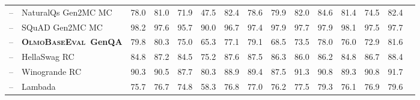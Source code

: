 \documentclass[table]{ai2style/ai2}
\newcommand{\olmothreeeval}{\textsc{OlmoBaseEval}\xspace}
\begin{document}
\begin{table}[t]
{{\begin{NiceTabular}{@{}Hl
P{38pt}C{38pt}C{38pt}C{38pt}C{38pt}C{38pt}|C{38pt}C{38pt}C{38pt}C{38pt}C{38pt}C{38pt}H@{}}
 -- & NaturalQs Gen2MC MC                                                                                    & 78.0                    & 81.0               & 71.9                 & 47.5                 & 82.4                       & 78.6                  & 79.9                  & 82.0                 & 84.6                     & 81.4              & 74.5                 & 82.4                   \\
 -- & SQuAD Gen2MC MC                                                                                        & 98.2                    & 97.6               & 95.7                 & 90.0                 & 96.7                       & 97.4                  & 97.9                  & 97.7                 & 97.9                     & 98.1              & 97.5                 & 97.7                   \\
\midrule
{}   -- & {\textbf{\olmothreeeval \fontsize{9}{9}\selectfont~GenQA}}                                             & 79.8                    & 80.3               & 75.0                 & 65.3                 & 77.1                       & 79.1                  & 68.5                  & 73.5                 & 78.0                     & 76.0              & 72.9                 & 81.6                   \\
 -- & HellaSwag RC                                                                                           & 84.8                    & 87.2               & 84.5                 & 75.2                 & 87.6                       & 87.5                  & 86.3                  & 86.0                 & 86.2                     & 84.8              & 86.7                 & 88.4                   \\
 -- & Winogrande RC                                                                                          & 90.3                    & 90.5               & 87.7                 & 80.3                 & 88.9                       & 89.4                  & 87.5                  & 91.3                 & 90.8                     & 89.3              & 90.8                 & 91.7                   \\
 -- & Lambada                                                                                                & 75.7                    & 76.7               & 74.8                 & 58.3                 & 76.8                       & 77.0                  & 76.2                  & 77.5                 & 79.3                     & 76.1              & 76.9                 & 79.6                   \\

\end{NiceTabular}}}
\end{table}
\end{document}
